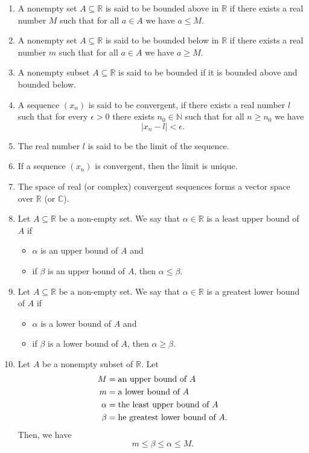 \documentclass{article}
\theoremstyle{definition}
\begin{document}
    \begin{enumerate}
        \item A nonempty set $A\subseteq \mathbb{R} $ is said to be bounded above in $\mathbb{R} $ if there exists a real number $M$ such that for all $a\in A$ we have $a \le M$.  
        \item A nonempty set $A\subseteq \mathbb{R} $ is said to be bounded below in $\mathbb{R} $ if there exists a real number $m$ such that for all $a\in A$ we have $a \ge M$.  
        \item A nonempty subset $A\subseteq \mathbb{R} $ is said to be bounded if it is bounded above and bounded below. 
        \item A sequence $\left( x_n \right) $  is said to be convergent, if there exists a real number $l$ such that for every $\epsilon >0$ there exists $n_0\in \mathbb{N} $ such that for all $n\ge n_0$ we have
        \[
             \left\vert x_n-l \right\vert < \epsilon .
        \]
        \item The real number $l$ is said to be the limit of the sequence. 
        \item If a sequence $\left( x_n \right) $ is convergent, then the limit is unique.
        \item The space of real (or complex) convergent sequences forms a vector space over $\mathbb{R} $ (or $\mathbb{C} $).
        \item Let $A\subseteq \mathbb{R} $ be a non-empty set. We say that $\alpha \in \mathbb{R}$ is a least upper bound of $A$ if
        \begin{itemize}
            \item $\alpha $ is an upper bound of $A$ and 
            \item if $\beta $ is an upper bound of $A$, then $\alpha \leq \beta$.  
        \end{itemize}
        \item Let $A\subseteq \mathbb{R} $ be a non-empty set. We say that $\alpha \in \mathbb{R}$ is a greatest lower bound of $A$ if
        \begin{itemize}
            \item $\alpha $ is a lower bound of $A$ and 
            \item if $\beta $ is a lower bound of $A$, then $\alpha \geq \beta$.  
        \end{itemize}
        \item Let $A$ be a nonempty subset of $\mathbb{R} $. Let 
        \begin{align*}
            M & = \textup{an upper bound of } A
            \\
            m & = \textup{a lower bound of } A
            \\
            \alpha  & = \textup{the least  upper bound of } A
            \\
            \beta  & = \textup{he greatest  lower bound of } A.
        \end{align*}
        Then, we have
        \[
            m \le \beta  \le \alpha  \le M.
        \]
    \end{enumerate}
\end{document}
